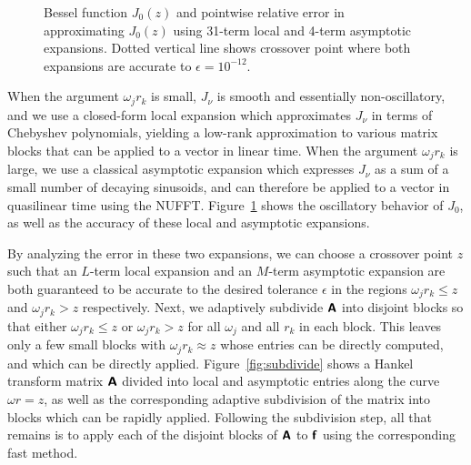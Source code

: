 \begin{figure}[!t]
\begin{subfigure}[b]{0.45\textwidth}
  \end{subfigure}
  \caption{Bessel function $J_0(z)$ and pointwise relative error in
  approximating $J_0(z)$ using 31-term local and 4-term asymptotic expansions.
  Dotted vertical line shows crossover point where both expansions are accurate
  to $\epsilon = 10^{-12}$.}
  \label{fig:two-expansions}
\end{figure}

When the argument $\omega_j r_k$ is small, $J_\nu$ is smooth and essentially
non-oscillatory, and we use a closed-form local expansion which approximates
$J_\nu$ in terms of Chebyshev polynomials, yielding a low-rank approximation to
various matrix blocks that can be applied to a vector in linear time. When the
argument $\omega_j r_k$ is large, we use a classical asymptotic expansion which
expresses $J_\nu$ as a sum of a small number of decaying sinusoids, and can
therefore be applied to a vector in quasilinear time using the NUFFT.
Figure~\ref{fig:two-expansions} shows the oscillatory behavior of $J_0$, as well
as the accuracy of these local and asymptotic expansions.

By analyzing the error in these two expansions, we can choose a crossover point
$z$ such that an $L$-term local expansion and an $M$-term asymptotic expansion
are both guaranteed to be accurate to the desired tolerance $\epsilon$ in the
regions $\omega_j r_k \leq z$ and $\omega_j r_k > z$ respectively. Next, we
adaptively subdivide $\bm{\mathsf{A}}$ into disjoint blocks so that either $\omega_j r_k
\leq z$ or $\omega_j r_k > z$ for all $\omega_j$ and all $r_k$ in each block.
This leaves only a few small blocks with $\omega_j r_k \approx z$ whose entries
can be directly computed, and which can be directly applied.
Figure~\ref{fig:subdivide} shows a Hankel transform matrix $\bm{\mathsf{A}}$ divided
into local and asymptotic entries along the curve $\omega r = z$, as well as the
corresponding adaptive subdivision of the matrix into blocks which can be
rapidly applied. Following the subdivision step, all that remains is to apply
each of the disjoint blocks of $\bm{\mathsf{A}}$ to $\bm{\mathsf{f}}$ using the corresponding
fast method.

